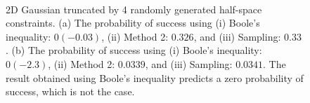 \documentclass[letterpaper]{article}
\begin{document}
\begin{figure}[!bt]
\begin{center}
\hspace{10pt}
\\
\end{center}
\caption{2D Gaussian truncated by 4 randomly generated half-space constraints. (a) The probability of success using (i) Boole's inequality: $0 (-0.03)$, (ii) Method 2: $0.326$, and (iii) Sampling: $0.33$. (b) The probability of success using (i) Boole's inequality: $0 (-2.3)$, (ii) Method 2: $0.0339$, and (iii) Sampling: $0.0341$. The result obtained using Boole's inequality predicts a zero probability of success, which is not the case.}
\label{fig:panel2}
\vspace{-10pt}
\end{figure}
\end{document}
